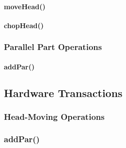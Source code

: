 \paragraph{moveHead()}

\paragraph{chopHead()}

\subsubsection{Parallel Part Operations}

\paragraph{addPar()}

\subsection{Hardware Transactions}

\subsubsection{Head-Moving Operations}

\subsubsection{addPar()}
